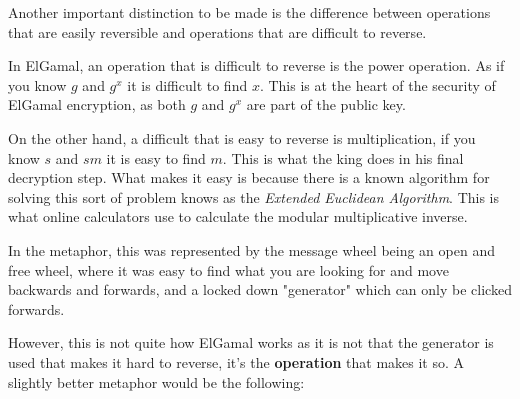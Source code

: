 \documentclass{article}
\begin{document}
  Another important distinction to be made is the difference between operations
  that are easily reversible and operations that are difficult to reverse.
  
  In ElGamal, an operation that is difficult to reverse is the power operation.
  As if you know $g$ and $g^x$ it is difficult to find $x$. This is at the
  heart of the security of ElGamal encryption, as both $g$ and $g^x$ are 
  part of the public key.

  On the other hand, a difficult that is easy to reverse is multiplication,
  if you know $s$ and $sm$ it is easy to find $m$. This is what the king does
  in his final decryption step. What makes it easy is because there is a known
  algorithm for solving this sort of problem knows as the \textit{Extended Euclidean Algorithm}.
  This is what online calculators use to calculate the modular multiplicative
  inverse.

  In the metaphor, this was represented by the message wheel being an open and
  free wheel, where it was easy to find what you are looking for and move
  backwards and forwards, and a locked down "generator" which can only be clicked
  forwards.

  However, this is not quite how ElGamal works as it is not that the generator
  is used that makes it hard to reverse, it's the \textbf{operation} that makes
  it so. A slightly better metaphor would be the following:
\end{document}
